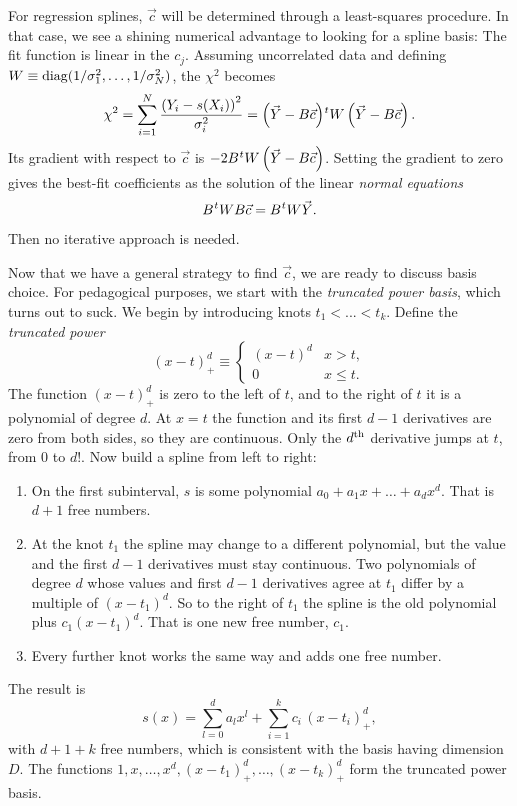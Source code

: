 For regression splines, $\vec{c}$ will be determined through a least-squares
procedure. In that case, we see a shining numerical advantage to looking for a
spline basis: The fit function is linear in the $c_j$.  
Assuming uncorrelated data and defining 
$W\equiv\mathop{\mathrm{diag}}(1/\sigma_1^2,\dots,1/\sigma_N^2)$, the $\chi^2$ becomes 
\begin{equation}
  \chi^2=\sum_{i=1}^N\frac{\left(Y_i-s(X_i)\right)^2}{\sigma_i^2}
              =\trans{\left(\vec{Y}-B\vec{c}\right)} W\left(\vec{Y}-B\vec{c}\right).
\end{equation}
Its gradient with respect to $\vec{c}$ is $-2\trans{B} W\left(\vec{Y}-B\vec{c}\right)$. 
Setting the
gradient to zero gives the best-fit coefficients as the solution of the linear
{\it normal equations}
\begin{equation}\label{eq:normal}
  \trans{B} W B\vec{c} = \trans{B} W\vec{Y}.
\end{equation}
Then no iterative approach is needed.

Now that we have a general strategy to find $\vec{c}$, we are ready to discuss
basis choice. For pedagogical purposes, we start with the {\it truncated power
basis}, which turns out to suck.
We begin by introducing knots $t_1<...<t_k$.
Define the {\it truncated power}
\begin{equation}
  (x-t)_+^d \equiv 
  \begin{cases}
    (x-t)^d & x>t,\\
    0       & x\le t .
  \end{cases}
\end{equation}
The function $(x-t)_+^d$ is zero to the left of $t$, and to the right of $t$ it
is a polynomial of degree $d$. At $x=t$ the function and its first $d-1$
derivatives are zero from both sides, so they are continuous. Only the $d{}^{\rm th}$
derivative jumps at $t$, from $0$ to $d!$. Now build a spline from left to
right:
\begin{enumerate}
  \item On the first subinterval, $s$ is some polynomial
  $a_0+a_1x+\dots+a_dx^d$. That is $d+1$ free numbers.
  \item At the knot $t_1$ the spline may change to a different polynomial, but
  the value and the first $d-1$ derivatives must stay continuous. Two
  polynomials of degree $d$ whose values and first $d-1$ derivatives agree at
  $t_1$ differ by a multiple of $(x-t_1)^d$. So to the right of $t_1$ the spline
  is the old polynomial plus $c_1(x-t_1)^d$. That is one new free number, $c_1$.
  \item Every further knot works the same way and adds one free number.
\end{enumerate}
The result is
\begin{equation}\label{eq:truncated}
  s(x)=\sum_{l=0}^{d} a_l x^l + \sum_{i=1}^{k} c_i\,(x-t_i)_+^d ,
\end{equation}
with $d+1+k$ free numbers, which is consistent with the basis having dimension
$D$. The functions
$1,x,\dots,x^d,(x-t_1)_+^d,\dots,(x-t_k)_+^d$ form the
truncated power basis.

